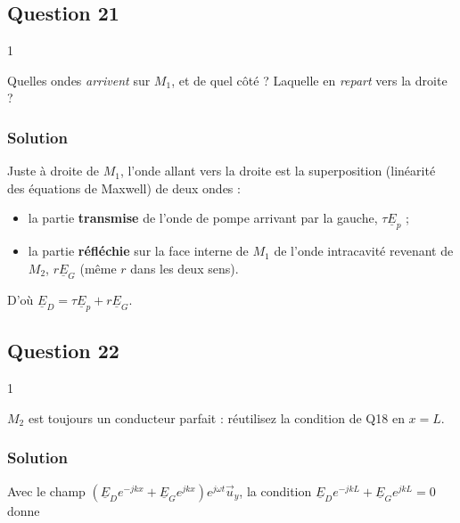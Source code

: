 \documentclass[11pt,a4paper]{article}
\providecommand{\tightlist}{\setlength{\itemsep}{0pt}\setlength{\parskip}{0pt}}
\begin{document}
\hypertarget{question-21}{%
\subsection{Question 21}\label{question-21}}

\begin{indication}{1}

Quelles ondes \emph{arrivent} sur \(M_1\), et de quel côté ? Laquelle en \emph{repart} vers la droite ?

\end{indication}

\hypertarget{solution-20}{%
\subsubsection{Solution}\label{solution-20}}

Juste à droite de \(M_1\), l'onde allant vers la droite est la superposition (linéarité des équations de Maxwell) de deux ondes :

\begin{itemize}
\tightlist
\item
  la partie \textbf{transmise} de l'onde de pompe arrivant par la gauche, \(\tau\underline E_p\) ;
\item
  la partie \textbf{réfléchie} sur la face interne de \(M_1\) de l'onde intracavité revenant de \(M_2\), \(r\underline E_G\) (même \(r\) dans les deux sens).
\end{itemize}

D'où \(\underline E_D=\tau\underline E_p+r\underline E_G\).

\hypertarget{question-22}{%
\subsection{Question 22}\label{question-22}}

\begin{indication}{1}

\(M_2\) est toujours un conducteur parfait : réutilisez la condition de Q18 en \(x=L\).

\end{indication}

\hypertarget{solution-21}{%
\subsubsection{Solution}\label{solution-21}}

Avec le champ \(\left(\underline E_De^{-jkx}+\underline E_Ge^{jkx}\right)e^{j\omega t}\vec u_y\), la condition \(\underline E_De^{-jkL}+\underline E_Ge^{jkL}=0\) donne
\end{document}
